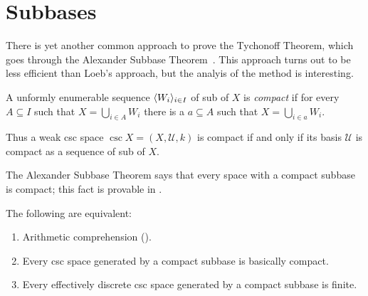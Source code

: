 \documentclass[csc]{subfiles}
\begin{document}
\section{Subbases}

There is yet another common approach to prove the Tychonoff Theorem, which goes through the Alexander Subbase Theorem~\cite{Alexander39}.
This approach turns out to be less efficient than Loeb's approach, but the analyis of the method is interesting.

\begin{definition}[\RCA]
  A unformly enumerable sequence \(\langle W_i\rangle_{i \in I}\) of sub of \(X\) is \emph{compact} if for every \eset{} \(A \subseteq I\) such that \(X = \bigcup_{i \in A} W_i\) there is a \fset{} \(a \subseteq A\) such that \(X = \bigcup_{i \in a} W_i.\)
\end{definition}

\noindent
Thus a weak csc space \(\csc{X}=(X,\mathcal{U},k)\) is compact if and only if its basis \(\mathcal{U}\) is compact as a sequence of sub of \(X.\)

The Alexander Subbase Theorem says that every space with a compact subbase is compact; this fact is provable in \ACA.

\begin{theorem}[\RCA]\label{T:AlexanderACA}
  The following are equivalent:
  \begin{enumerate}[\upshape(1)]
  \item Arithmetic comprehension \textup(\ACA\textup).
  \item Every csc space generated by a compact subbase is basically compact.
  \item Every effectively discrete csc space generated by a compact subbase is finite.
  \end{enumerate}
\end{theorem}
\end{document}

